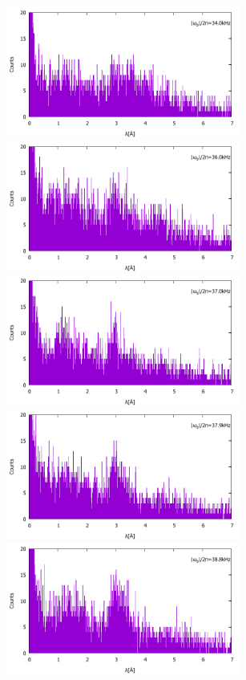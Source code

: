 \begin{figure}[h]
\includegraphics[height=4.3cm]{resonance/results/Flipper1_RawCounts_340kHz.pdf}
\includegraphics[height=4.3cm]{resonance/results/Flipper1_RawCounts_360kHz.pdf}\\
\includegraphics[height=4.3cm]{resonance/results/Flipper1_RawCounts_370kHz.pdf}
\includegraphics[height=4.3cm]{resonance/results/Flipper1_RawCounts_379kHz.pdf}\\
\includegraphics[height=4.3cm]{resonance/results/Flipper1_RawCounts_388kHz.pdf}

\end{figure}
